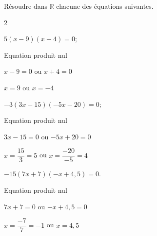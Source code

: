 \documentclass[11pt,a4paper]{article}  %
\begin{document}

Résoudre dans $\mathbb{R}$ chacune des équations suivantes.
\begin{multicols}{2}
	\begin{enumMet}
		\item $5(x-9)(x+4)=0$;
		\begin{corrBox}
			Equation produit nul
			
			$x-9=0$ ou $x+4=0$
			
			$x=9$ ou $x=-4$	
			
		\end{corrBox}
		\item $-3(3x-15)(-5x-20)=0$;
		\begin{corrBox}
			Equation produit nul
			
			$3x-15=0$ ou $-5x+20=0$
			
			$x=\dfrac{15}{3}=5$ ou $x=\dfrac{-20}{-5}=4$	
			
			\framebox{$S=\{4;5\}$}
		\end{corrBox}
		\item {} $-15(7 x+7)(-x+4,5)=0$.
		\begin{corrBox}
			Equation produit nul
			
			$7x+7=0$ ou $-x+4,5=0$
			
			$x=\dfrac{-7}{7}=-1$ ou $x=4,5$	
			
			\framebox{$S=\{-1\ ;\ 4,5\}$}
		\end{corrBox}
	\end{enumMet}
\end{multicols}

\end{document}
